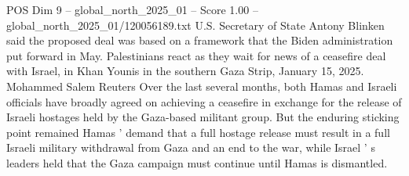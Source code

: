 \begin{textsample}{POS Dim 9 – global\_north\_2025\_01 – Score 1.00 – global\_north\_2025\_01/120056189.txt}
U.S.
Secretary of State Antony Blinken said the proposed deal was based on a framework that the Biden administration put forward in May.
Palestinians react as they wait for news of a ceasefire deal with Israel, in Khan Younis in the southern Gaza Strip, January 15, 2025.
Mohammed Salem Reuters Over the last several months, both Hamas and Israeli officials have broadly agreed on achieving a ceasefire in exchange for the release of Israeli hostages held by the Gaza-based militant group.
But the enduring sticking point remained Hamas ' demand that a full hostage release must result in a full Israeli military withdrawal from Gaza and an end to the war, while Israel ' s leaders held that the Gaza campaign must continue until Hamas is dismantled.

\end{textsample}
